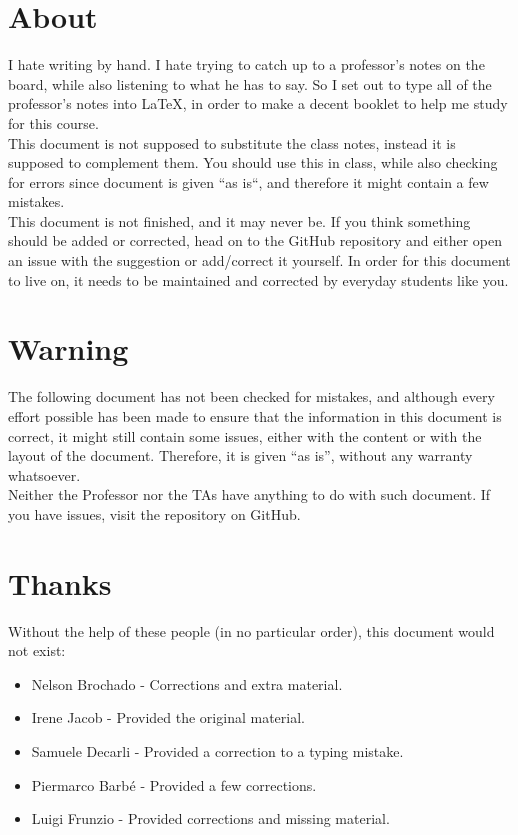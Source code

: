 \section*{About}
I hate writing by hand. I hate trying to catch up to a professor's notes on the board, while also listening to what he has to say. So I set out to type all of the professor's notes into \LaTeX, in order to make a decent booklet to help me study for this course.\\

This document is not supposed to substitute the class notes, instead it is supposed to complement them. You should use this in class, while also checking for errors since document is given ``as is``, and therefore it might contain a few mistakes.\\

This document is not finished, and it may never be. If you think something should be added or corrected, head on to the GitHub repository and either open an issue with the suggestion or add/correct it yourself. In order for this document to live on, it needs to be maintained and corrected by everyday students like you.

\section*{Warning}
The following document has not been checked for mistakes, and although every effort possible has been made to ensure that the information in this document is correct, it might still contain some issues, either with the content or with the layout of the document. Therefore, it is given ``as is'', without any warranty whatsoever. \\

Neither the Professor nor the TAs have anything to do with such document. If you have issues, visit the repository on GitHub.

\section*{Thanks}
Without the help of these people (in no particular order), this document would not exist:
\begin{itemize}
\item Nelson Brochado - Corrections and extra material.
\item Irene Jacob - Provided the original material.
\item Samuele Decarli - Provided a correction to a typing mistake.
\item Piermarco Barb\'{e} - Provided a few corrections.
\item Luigi Frunzio - Provided corrections and missing material.
\end{itemize}	


